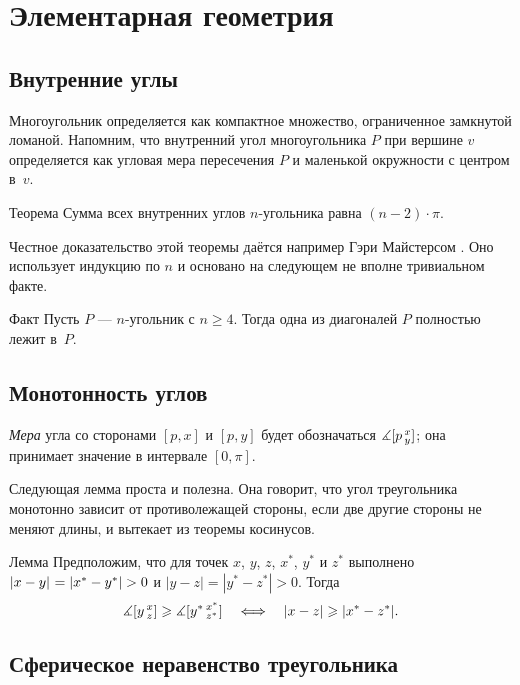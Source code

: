 \section{Элементарная геометрия}

\subsection*{Внутренние углы}

Многоугольник определяется как компактное множество, ограниченное замкнутой ломаной. 
Напомним, что внутренний угол многоугольника $P$ при вершине $v$
определяется как угловая мера пересечения $P$ и маленькой окружности с центром в~$v$.

\begin{thm}{Теорема}\label{thm:sum=(n-2)pi}
Сумма всех внутренних углов $n$-угольника равна $(n-2)\cdot\pi$. 
\end{thm}

Честное доказательство этой теоремы даётся например Гэри Майстерсом \cite{meisters}.
Оно использует индукцию по $n$ и основано на следующем не вполне тривиальном факте.

\begin{thm}{Факт}
Пусть $P$ --- $n$-угольник с $n\ge 4$.
Тогда одна из диагоналей $P$ полностью лежит в~$P$.
\end{thm}

\subsection*{Монотонность углов}

{}\emph{Мера} угла со сторонами $[p,x]$ и $[p,y]$ будет обозначаться $\measuredangle[p\,{}^{x}_{y}]$;
она принимает значение в интервале $[0,\pi]$.

Следующая лемма проста и полезна.
Она говорит, что угол треугольника монотонно зависит от противолежащей стороны, если две другие стороны не меняют длины, и вытекает из теоремы косинусов.

\begin{thm}{Лемма}\label{lem:angle-monotonicity}
Предположим, что для точек $x$, $y$, $z$, $x^{*}$, $y^{*}$ и $z^{*}$ выполнено $\dist{x}{y}{}\z=|x^{*}-y^{*}|>0$ и $|y-z|=|y^{*}-z^{*}|>0$.
Тогда 
\[\measuredangle[y\,{}^{x}_{z}]
\geqslant
\measuredangle[y^{*}\,{}^{x^{*}}_{z^{*}}]
\quad\Longleftrightarrow\quad
|x-z|\geqslant |x^{*}-z^{*}|.\]
\end{thm}

\subsection*{Сферическое неравенство треугольника}

